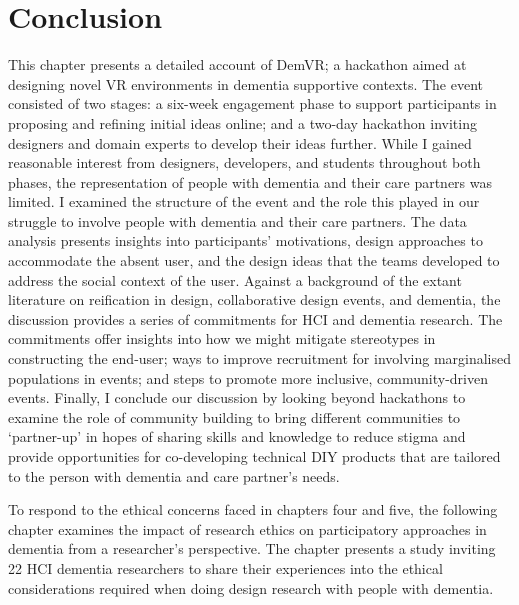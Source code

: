 \section{Conclusion}
\label{sec:Conclusion}
This chapter presents a detailed account of DemVR; a hackathon aimed at designing novel VR environments in dementia supportive contexts. The event consisted of two stages: a six-week engagement phase to support participants in proposing and refining initial ideas online; and a two-day hackathon inviting designers and domain experts to develop their ideas further. While I gained reasonable interest from designers, developers, and students throughout both phases, the representation of people with dementia and their care partners was limited. I examined the structure of the event and the role this played in our struggle to involve people with dementia and their care partners. The data analysis presents insights into participants’ motivations, design approaches to accommodate the absent user, and the design ideas that the teams developed to address the social context of the user. Against a background of the extant literature on reification in design, collaborative design events, and dementia, the discussion provides a series of commitments for HCI and dementia research. The commitments offer insights into how we might mitigate stereotypes in constructing the end-user; ways to improve recruitment for involving marginalised populations in events; and steps to promote more inclusive, community-driven events. Finally, I conclude our discussion by looking beyond hackathons to examine the role of community building to bring different communities to ‘partner-up’ in hopes of sharing skills and knowledge to reduce stigma and provide opportunities for co-developing technical DIY products that are tailored to the person with dementia and care partner’s needs.

To respond to the ethical concerns faced in chapters four and five, the following chapter examines the impact of research ethics on participatory approaches in dementia from a researcher's perspective. The chapter presents a study inviting 22 HCI dementia researchers to share their experiences into the ethical considerations required when doing design research with people with dementia.



